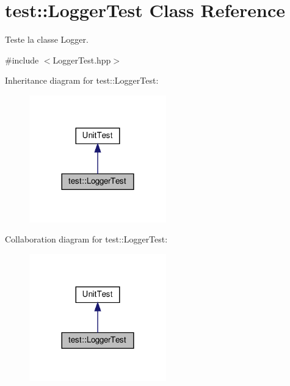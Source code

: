 \hypertarget{classtest_1_1LoggerTest}{}\section{test\+:\+:Logger\+Test Class Reference}
\label{classtest_1_1LoggerTest}


Teste la classe Logger.  




{\ttfamily \#include $<$Logger\+Test.\+hpp$>$}



Inheritance diagram for test\+:\+:Logger\+Test\+:
\nopagebreak
\begin{figure}[H]
\begin{center}
\leavevmode
\includegraphics[width=168pt]{classtest_1_1LoggerTest__inherit__graph}
\end{center}
\end{figure}


Collaboration diagram for test\+:\+:Logger\+Test\+:
\nopagebreak
\begin{figure}[H]
\begin{center}
\leavevmode
\includegraphics[width=168pt]{classtest_1_1LoggerTest__coll__graph}
\end{center}
\end{figure}
